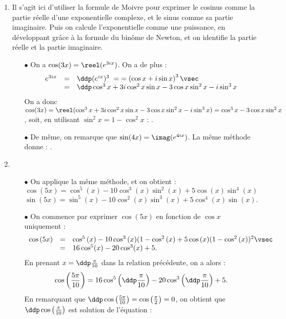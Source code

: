 
\begin{correction}   \;
\begin{enumerate}
\item Il s'agit ici d'utiliser la formule de Moivre pour exprimer le cosinus comme la partie r\'eelle d'une exponentielle complexe, et le sinus comme sa partie imaginaire. Puis on calcule l'exponentielle comme une puissance, en d\'eveloppant gr\^ace \`a la formule du bin\^ome de Newton, et on identifie la partie r\'eelle et la partie imaginaire.
\begin{itemize}
\item[$\bullet$] On a $\cos (3x) = \reel(e^{3ix})$. On a de plus :
$$\begin{array}{rcl}
e^{3ix} & = & \ddp (e^{ix})^3 \; = \; = \left(\cos x + i \sin x \right)^3\vsec\\
& = & \ddp \cos^3 x + 3 i \cos^2 x \sin x - 3 \cos x \sin^2 x - i \sin^3 x
\end{array}$$
On a donc $\cos (3x) = \reel (\cos^3 x + 3 i \cos^2 x \sin x - 3 \cos x \sin^2 x - i \sin^3 x) = \cos^3{x}-3\cos{x}\sin^2{x}$, soit, en utilisant $\sin^2 x =1-\cos^2 x$ : . 
\item[$\bullet$] De m\^eme, on remarque que $\sin(4x) = \imag(e^{4ix})$. La m\^eme m\'ethode donne : .
\end{itemize}
\item 
\begin{itemize}
\item[$\bullet$]  On applique la m\^eme m\'ethode, et on obtient :
$$\cos{(5x)} = \cos^5{(x)}-10\cos^3{(x)}\sin^2{(x)}+5\cos{(x)}\sin^4{(x)}$$
$$\sin{(5x)}= \sin^5{(x)} -10\cos^2{(x)}\sin^3{(x)}+5\cos^4{(x)}\sin{(x)}  .$$
\item[$\bullet$] On commence par exprimer $\cos{(5x)}$ en fonction de $\cos x$ uniquement :
$$\begin{array}{rcl}
\cos{(5x)} & = & \cos^5{(x)}-10\cos^3{(x)}(1-\cos^2{(x)}+5\cos{(x)}(1-\cos^2{(x)})^2 \vsec\\
 & = & 16 \cos^5 (x) - 20 \cos^3(x) + 5. 
 \end{array}$$
En prenant $x=\ddp\frac{\pi}{10}$ dans la relation pr\'ec\'edente, on a alors :
$$\cos{\left(\frac{5\pi}{10}\right)} = 16 \cos^5{\left( \ddp\frac{\pi}{10}\right)}-20\cos^3{\left( \ddp\frac{\pi}{10}\right)}+5.$$
En remarquant que $\ddp \cos{\left(\frac{5\pi}{10}\right)} = \cos{\left(\frac{\pi}{2}\right)}=0$, on obtient que $\ddp \cos{\left(\frac{\pi}{10}\right)}$ est solution de l'\'equation :

\end{itemize}
\end{enumerate}
\end{correction}
